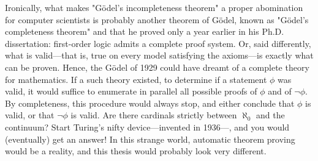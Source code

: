 Ironically, what makes "Gödel's incompleteness theorem" a proper
abomination for computer scientists is probably another theorem of Gödel,
known as "Gödel's completeness theorem" and that he proved
only a year earlier in his Ph.D. dissertation: 
first-order logic admits a complete proof system. Or, said differently,
what is valid---that is, true on every model satisfying the axioms---is exactly what
can be proven. 
Hence, the Gödel of 1929 could have dreamt of a complete theory for mathematics.
If a such theory existed, to determine if a statement $\phi$ was valid, it would suffice
to enumerate in parallel all possible proofs of $\phi$ and of $\neg \phi$. By completeness, this 
procedure would always stop, and either conclude that $\phi$ is valid, or that
$\neg \phi$ is valid.
Are there cardinals strictly between $\aleph_0$ and the continuum?
Start Turing's nifty device---invented in 1936---, and you would (eventually) get an answer! In this strange world, automatic theorem proving would be a reality,
and this thesis would probably look very different.

